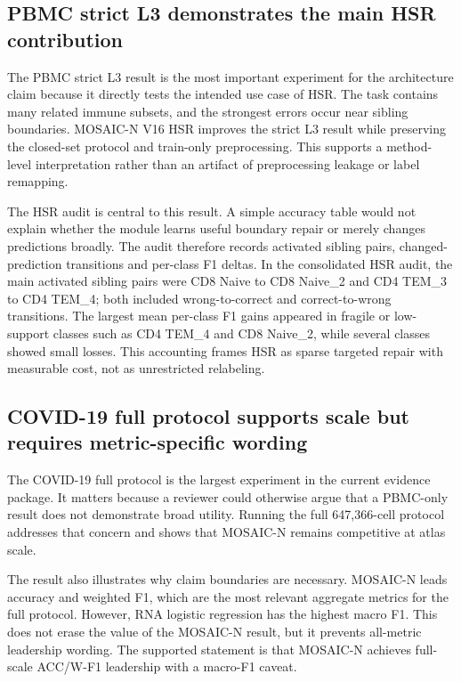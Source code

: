 \documentclass[unnumsec,webpdf,contemporary,large,numbered]{oup-authoring-template}
\begin{document}
\subsection{PBMC strict L3 demonstrates the main HSR contribution}

The PBMC strict L3 result is the most important experiment for the architecture claim because it directly tests the intended use case of HSR. The task contains many related immune subsets, and the strongest errors occur near sibling boundaries. MOSAIC-N V16 HSR improves the strict L3 result while preserving the closed-set protocol and train-only preprocessing. This supports a method-level interpretation rather than an artifact of preprocessing leakage or label remapping.

The HSR audit is central to this result. A simple accuracy table would not explain whether the module learns useful boundary repair or merely changes predictions broadly. The audit therefore records activated sibling pairs, changed-prediction transitions and per-class F1 deltas. In the consolidated HSR audit, the main activated sibling pairs were CD8 Naive to CD8 Naive\_2 and CD4 TEM\_3 to CD4 TEM\_4; both included wrong-to-correct and correct-to-wrong transitions. The largest mean per-class F1 gains appeared in fragile or low-support classes such as CD4 TEM\_4 and CD8 Naive\_2, while several classes showed small losses. This accounting frames HSR as sparse targeted repair with measurable cost, not as unrestricted relabeling.

\subsection{COVID-19 full protocol supports scale but requires metric-specific wording}

The COVID-19 full protocol is the largest experiment in the current evidence package. It matters because a reviewer could otherwise argue that a PBMC-only result does not demonstrate broad utility. Running the full 647,366-cell protocol addresses that concern and shows that MOSAIC-N remains competitive at atlas scale.

The result also illustrates why claim boundaries are necessary. MOSAIC-N leads accuracy and weighted F1, which are the most relevant aggregate metrics for the full protocol. However, RNA logistic regression has the highest macro F1. This does not erase the value of the MOSAIC-N result, but it prevents all-metric leadership wording. The supported statement is that MOSAIC-N achieves full-scale ACC/W-F1 leadership with a macro-F1 caveat.
\end{document}
